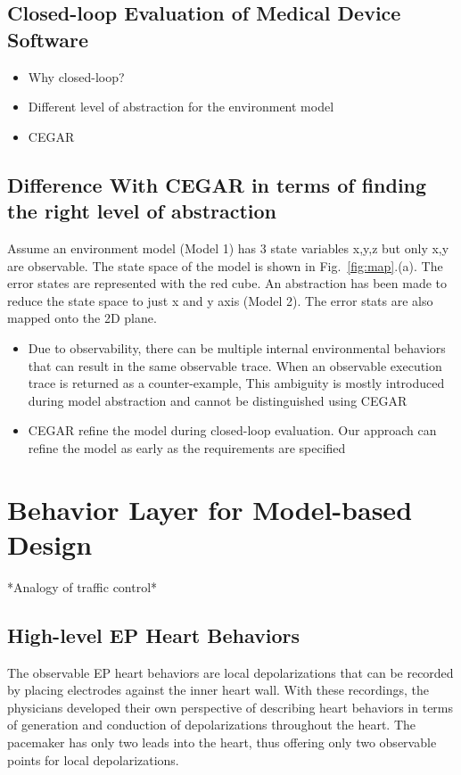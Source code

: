 \documentclass{llncs}
\newcommand{\figref}[1]{Fig.~\ref{fig:#1}}
\begin{document}
\subsection{Closed-loop Evaluation of Medical Device Software}
\begin{itemize}
	\item Why closed-loop?
    \item Different level of abstraction for the environment model
    \item CEGAR
\end{itemize}
\subsection{Difference With CEGAR in terms of finding the right level of abstraction}
Assume an environment model (Model 1) has 3 state variables \textsf{x,y,z} but only \textsf{x,y} are observable. The state space of the model is shown in \figref{map}.(a). The error states are represented with the red cube. An abstraction has been made to reduce the state space to just \textsf{x} and \textsf{y} axis (Model 2). The error stats are also mapped onto the 2D plane.  
\begin{itemize}
	\item Due to observability, there can be multiple internal environmental behaviors that can result in the same observable trace. When an observable execution trace is returned as a counter-example, This ambiguity is mostly introduced during model abstraction and cannot be distinguished using CEGAR
    \item CEGAR refine the model during closed-loop evaluation. Our approach can refine the model as early as the requirements are specified
    
\end{itemize}
\section{Behavior Layer for Model-based Design}
*Analogy of traffic control*
\subsection{High-level EP Heart Behaviors}
The observable EP heart behaviors are local depolarizations that can be recorded by placing electrodes against the inner heart wall. With these recordings, the physicians developed their own perspective of describing heart behaviors in terms of generation and conduction of depolarizations throughout the heart. The pacemaker has only two leads into the heart, thus offering only two observable points for local depolarizations.
\end{document}
